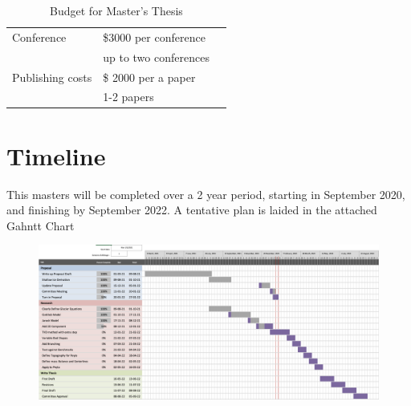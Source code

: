 \documentclass{article}
\begin{document}
\begin{table}[h]
    \centering
    \begin{tabular}{lll}
    Conference
         &  \$3000 per conference\\
         & up to two conferences \\
    Publishing costs
        & \$ 2000 per a paper \\
        & 1-2 papers \\
    
    \end{tabular}
    \caption{Budget for Master's Thesis}
    \label{tab:my_label}
\end{table}

\section{Timeline}
This masters will be completed over a 2 year period, starting in September 2020, and finishing by September 2022. A tentative plan is laided in the attached Gahntt Chart

\begin{figure}[H]
    \centering
    \includegraphics[width=17cm]{Proposal/GahnttChart.png}
    
    \label{fig:Gahntt Chart}
\end{figure}
\newpage


\end{document}
